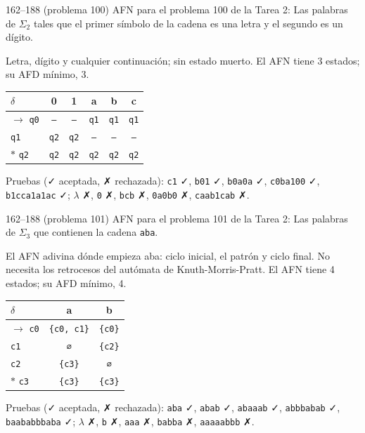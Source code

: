 \documentclass[11pt]{article}
\begin{document}
\begin{ejercicio}{162--188 (problema 100)}{}
AFN para el problema 100 de la Tarea 2: Las palabras de $\Sigma_2$ tales que el primer símbolo de la cadena es una letra y el segundo es un dígito.
\end{ejercicio}
\proc Letra, dígito y cualquier continuación; sin estado muerto. El AFN tiene 3 estados; su AFD mínimo, 3.
\begin{center}\small\begin{tabular}{lccccc}\toprule
$\delta$ & 0 & 1 & a & b & c \\\midrule
$\to$ \texttt{q0} & \texttt{--} & \texttt{--} & \texttt{q1} & \texttt{q1} & \texttt{q1} \\
 \texttt{q1} & \texttt{q2} & \texttt{q2} & \texttt{--} & \texttt{--} & \texttt{--} \\
$*$ \texttt{q2} & \texttt{q2} & \texttt{q2} & \texttt{q2} & \texttt{q2} & \texttt{q2} \\
\bottomrule\end{tabular}\end{center}
Pruebas (✓ aceptada, ✗ rechazada): \texttt{c1} ✓, \texttt{b01} ✓, \texttt{b0a0a} ✓, \texttt{c0ba100} ✓, \texttt{b1cca1a1ac} ✓; $\lambda$ ✗, \texttt{0} ✗, \texttt{bcb} ✗, \texttt{0a0b0} ✗, \texttt{caab1cab} ✗.



\begin{ejercicio}{162--188 (problema 101)}{}
AFN para el problema 101 de la Tarea 2: Las palabras de $\Sigma_3$ que contienen la cadena \texttt{aba}.
\end{ejercicio}
\proc El AFN adivina dónde empieza aba: ciclo inicial, el patrón y ciclo final. No necesita los retrocesos del autómata de Knuth-Morris-Pratt. El AFN tiene 4 estados; su AFD mínimo, 4.
\begin{center}\small\begin{tabular}{lcc}\toprule
$\delta$ & a & b \\\midrule
$\to$ \texttt{c0} & \texttt{\{c0, c1\}} & \texttt{\{c0\}} \\
 \texttt{c1} & \texttt{∅} & \texttt{\{c2\}} \\
 \texttt{c2} & \texttt{\{c3\}} & \texttt{∅} \\
$*$ \texttt{c3} & \texttt{\{c3\}} & \texttt{\{c3\}} \\
\bottomrule\end{tabular}\end{center}
Pruebas (✓ aceptada, ✗ rechazada): \texttt{aba} ✓, \texttt{abab} ✓, \texttt{abaaab} ✓, \texttt{abbbabab} ✓, \texttt{baababbbaba} ✓; $\lambda$ ✗, \texttt{b} ✗, \texttt{aaa} ✗, \texttt{babba} ✗, \texttt{aaaaabbb} ✗.
\end{document}
